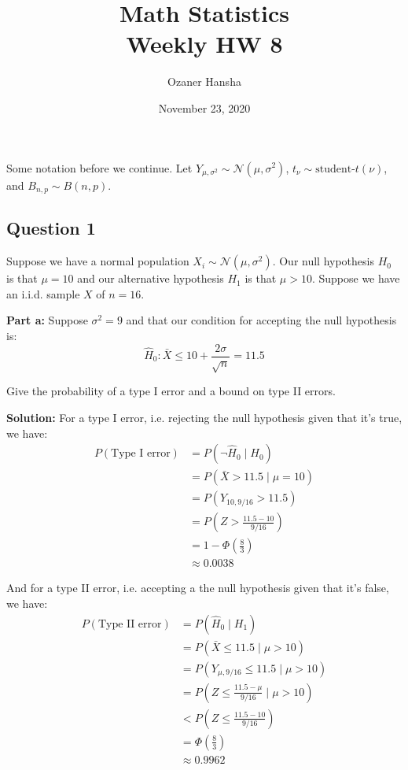 \documentclass{article}
\begin{document}
\title{Math Statistics\\ Weekly HW 8}
\author{Ozaner Hansha}
\date{November 23, 2020}
\maketitle

Some notation before we continue. Let $Y_{\mu,\sigma^2}\sim\mathcal N(\mu,\sigma^2)$, $t_{\nu}\sim\text{student-}t(\nu)$, and $B_{n,p}\sim B(n,p)$.

\subsection*{Question 1}
Suppose we have a normal population $X_i\sim\mathcal N(\mu,\sigma^2)$. Our null hypothesis $H_0$ is that $\mu=10$ and our alternative hypothesis $H_1$ is that $\mu>10$. Suppose we have an i.i.d. sample $X$ of $n=16$.
\bigskip

\noindent\textbf{Part a:} Suppose $\sigma^2=9$ and that our condition for accepting the null hypothesis is:
$$\hat H_0:\bar X\le 10+\frac{2\sigma}{\sqrt{n}}=11.5$$

Give the probability of a type I error and a bound on type II errors.
\bigskip

\noindent\textbf{Solution:} For a type I error, i.e. rejecting the null hypothesis given that it's true, we have:
\begin{align*}
    P(\text{Type I error})&=P(\neg\hat H_0\mid H_0)\tag{def. of type I error}\\
    &=P(\bar X>11.5\mid\mu=10)\tag{from def. of hypotheses}\\
    &=P(Y_{10,9/16}>11.5)\tag{$\bar X\sim\mathcal N(\mu,\sigma^2/n)$ mean of i.i.d. normals}\\
    &=P\left(Z>\frac{11.5-10}{9/16}\right)\tag{standardize normal RV}\\
    &=1-\Phi\left(\frac{8}{3}\right)\tag{cdf of normal RV}\\
    &\approx0.0038
\end{align*}

And for a type II error, i.e. accepting a the null hypothesis given that it's false, we have:
\begin{align*}
    P(\text{Type II error})&=P(\hat H_0\mid H_1)\tag{def. of type II error}\\
    &=P(\bar X\le11.5\mid\mu>10)\tag{from def. of hypotheses}\\
    &=P(Y_{\mu,9/16}\le11.5\mid\mu>10)\tag{$\bar X\sim\mathcal N(\mu,\sigma^2/n)$ mean of i.i.d. normals}\\
    &=P\left(Z\le\frac{11.5-\mu}{9/16}\mid\mu>10\right)\tag{standardize normal RV}\\
    &< P\left(Z\le\frac{11.5-10}{9/16}\right)\tag{$\Phi$ is strictly increasing}\\
    &=\Phi\left(\frac{8}{3}\right)\\
    &\approx0.9962
\end{align*}
\end{document}
